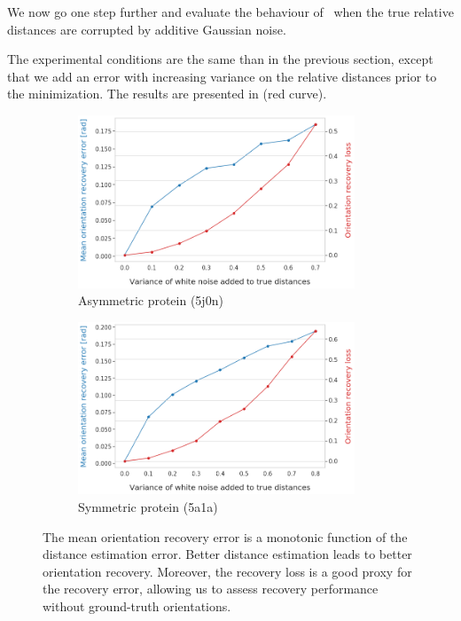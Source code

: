 
We now go one step further and evaluate the behaviour of~ when the true relative distances are corrupted by  additive Gaussian noise.

The experimental conditions are the same than in the previous section, except that we add an error with increasing variance on the relative distances prior to the minimization.
The results are presented in  (red curve).


\begin{figure}
    \centering
    \begin{subfigure}[b]{0.48\textwidth}
        \includegraphics[height=5.15cm]{images/5j0n_perfect_noisy_ar_aa.png}
        \caption{Asymmetric protein (5j0n)}
    \end{subfigure}
    \hfill
    \begin{subfigure}[b]{0.50\textwidth}
    \centering
        \includegraphics[height=5.15cm]{images/5a1a_perfect_noisy_ar_aa.png}
        \caption{Symmetric protein (5a1a)}
    \end{subfigure}
    \caption{
        The mean orientation recovery error  is a monotonic function of the distance estimation error.
        Better distance estimation leads to better orientation recovery.
        Moreover, the recovery loss  is a good proxy for the recovery error, allowing us to assess recovery performance without ground-truth orientations.
}
    \label{fig:perfect-with-noise-ar-aa}
\end{figure}

